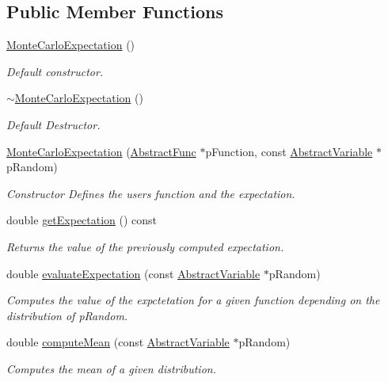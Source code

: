 \subsection*{Public Member Functions}
\begin{DoxyCompactItemize}
\item 
\mbox{\label{classMonteCarloExpectation_a503c5564902dd9b808181de315b93f5c}} 
\hyperlink{classMonteCarloExpectation_a503c5564902dd9b808181de315b93f5c}{Monte\+Carlo\+Expectation} ()
\begin{DoxyCompactList}\small\item\em Default constructor. \end{DoxyCompactList}\item 
\mbox{\label{classMonteCarloExpectation_a584a93ef10f6e75ca60939c3ed0b1468}} 
\hyperlink{classMonteCarloExpectation_a584a93ef10f6e75ca60939c3ed0b1468}{$\sim$\+Monte\+Carlo\+Expectation} ()
\begin{DoxyCompactList}\small\item\em Default Destructor. \end{DoxyCompactList}\item 
\hyperlink{classMonteCarloExpectation_ad595bc1f4a61d0138fd1d55e11b4d267}{Monte\+Carlo\+Expectation} (\hyperlink{classAbstractFunc}{Abstract\+Func} $\ast$p\+Function, const \hyperlink{classAbstractVariable}{Abstract\+Variable} $\ast$p\+Random)
\begin{DoxyCompactList}\small\item\em Constructor Defines the user\textquotesingle{}s function and the expectation. \end{DoxyCompactList}\item 
double \hyperlink{classMonteCarloExpectation_a0cadc5362ae4d9073f4131ed9208053c}{get\+Expectation} () const
\begin{DoxyCompactList}\small\item\em Returns the value of the previously computed expectation. \end{DoxyCompactList}\item 
double \hyperlink{classMonteCarloExpectation_a3ded4ade26374189ab6d79f2c6928b0a}{evaluate\+Expectation} (const \hyperlink{classAbstractVariable}{Abstract\+Variable} $\ast$p\+Random)
\begin{DoxyCompactList}\small\item\em Computes the value of the expctetation for a given function depending on the distribution of p\+Random. \end{DoxyCompactList}\item 
double \hyperlink{classMonteCarloExpectation_a6f4489cc63ca48fcbf5f2cdd6258dfcc}{compute\+Mean} (const \hyperlink{classAbstractVariable}{Abstract\+Variable} $\ast$p\+Random)
\begin{DoxyCompactList}\small\item\em Computes the mean of a given distribution. \end{DoxyCompactList}\end{DoxyCompactItemize}


